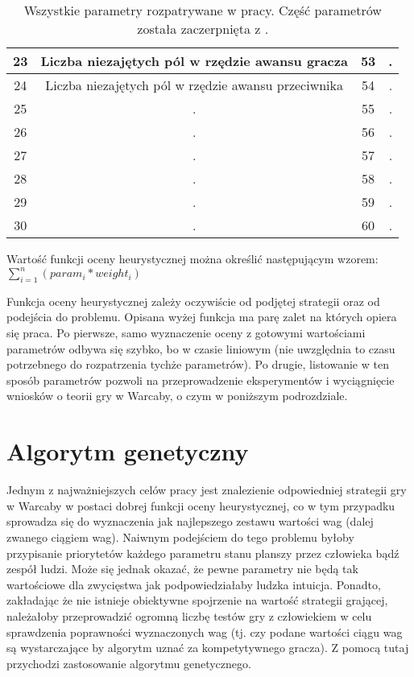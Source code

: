 {\begin{center}
\begin{table}
{\begin{tabular}{|c | c || c | c|}
 23 & Liczba niezajętych pól w rzędzie awansu gracza & 53 & . \\
 \hline
 24 & Liczba niezajętych pól w rzędzie awansu przeciwnika & 54 & . \\
 \hline
 25 & . & 55 & . \\
 \hline
 26 & . & 56 & . \\ 
 \hline
 27 & . & 57 & . \\
 \hline
 28 & . & 58 & . \\
 \hline
 29 & . & 59 & . \\
 \hline
 30 & . & 60 & . \\
 \hline
\end{tabular}
}
\caption{Wszystkie parametry rozpatrywane w pracy. Część parametrów została zaczerpnięta z \cite{EvoCheckers}.}
\end{table}
\end{center}
}

\FloatBarrier

Wartość funkcji oceny heurystycznej można określić następującym wzorem:
{\centering
$\sum_{i=1}^{n}(param_i * weight_i)$
}

Funkcja oceny heurystycznej zależy oczywiście od podjętej strategii oraz od podejścia do problemu. Opisana wyżej funkcja ma parę zalet na których opiera się praca. Po pierwsze, samo wyznaczenie oceny z gotowymi wartościami parametrów odbywa się szybko, bo w czasie liniowym (nie uwzględnia to czasu potrzebnego do rozpatrzenia tychże parametrów). Po drugie, listowanie w ten sposób parametrów pozwoli na przeprowadzenie eksperymentów i wyciągnięcie wniosków o teorii gry w Warcaby, o czym w poniższym podrozdziale.


\section{Algorytm genetyczny}

Jednym z najważniejszych celów pracy jest znalezienie odpowiedniej strategii gry w Warcaby w postaci dobrej funkcji oceny heurystycznej, co w tym przypadku sprowadza się do wyznaczenia jak najlepszego zestawu wartości wag (dalej zwanego ciągiem wag). Naiwnym podejściem do tego problemu byłoby przypisanie priorytetów każdego parametru stanu planszy przez człowieka bądź zespół ludzi. Może się jednak okazać, że pewne parametry nie będą tak wartościowe dla zwycięstwa jak podpowiedziałaby ludzka intuicja. Ponadto, zakładając że nie istnieje obiektywne spojrzenie na wartość strategii grającej, należałoby przeprowadzić ogromną liczbę testów gry z człowiekiem w celu sprawdzenia poprawności wyznaczonych wag (tj. czy podane wartości ciągu wag są wystarczające by algorytm uznać za kompetytywnego gracza). Z pomocą tutaj przychodzi zastosowanie algorytmu genetycznego.

